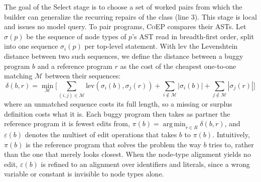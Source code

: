 \documentclass[acmsmall,screen,review,anonymous,nonacm]{acmart}
\DeclareMathOperator*{\argmin}{arg\,min}
\newcommand{\tool}{\textsc{CoEP}\xspace}
\begin{document}
The goal of the Select stage is to choose a set of worked pairs from which the builder can generalize the recurring repairs of the class (line 3). This stage is local and issues no model query. To pair programs, \tool compares their ASTs. Let $\sigma(p)$ be the sequence of node types of $p$'s AST read in breadth-first order, split into one sequence $\sigma_i(p)$ per top-level statement. With $\mathrm{lev}$ the Levenshtein distance between two such sequences, we define the distance between a buggy program $b$ and a reference program $r$ as the cost of the cheapest one-to-one matching $\mathcal{M}$ between their sequences:
\[
\delta(b, r) = \min_{\mathcal{M}} \Big[ \sum_{(i, j) \in \mathcal{M}} \mathrm{lev}(\sigma_i(b), \sigma_j(r)) + \sum_{i \notin \mathcal{M}} |\sigma_i(b)| + \sum_{j \notin \mathcal{M}} |\sigma_j(r)| \Big]
\]
where an unmatched sequence costs its full length, so a missing or surplus definition costs what it is. Each buggy program then takes as partner the reference program it is fewest edits from, $\pi(b) = \argmin_{r \in R} \delta(b, r)$, and $\varepsilon(b)$ denotes the multiset of edit operations that takes $b$ to $\pi(b)$. Intuitively, $\pi(b)$ is the reference program that solves the problem the way $b$ tries to, rather than the one that merely looks closest. When the node-type alignment yields no edit, $\varepsilon(b)$ is refined to an alignment over identifiers and literals, since a wrong variable or constant is invisible to node types alone.
\end{document}
